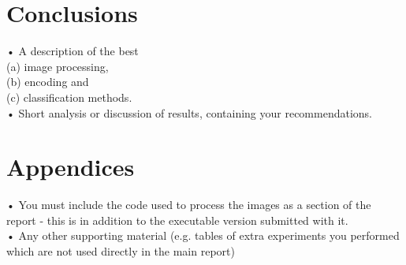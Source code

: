 \documentclass[12pt]{article}
\begin{document}
\section{Conclusions}

• A description of the best\\
(a) image processing,\\
(b) encoding and\\
(c) classification methods.\\
• Short analysis or discussion of results, containing your recommendations.

\section{Appendices}
• You must include the code used to process the images as a section of the report - this is in addition to the executable version submitted with it.\\
• Any other supporting material (e.g. tables of extra experiments you performed which are not used directly in the main report)

\newpage



\end{document}
